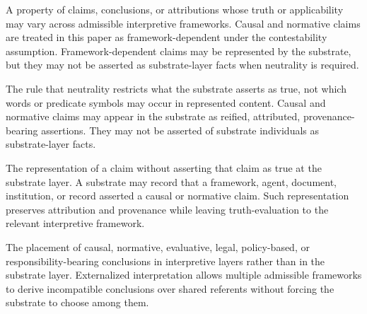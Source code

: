 \begin{description}[style=nextline,leftmargin=1.5cm]

\item[Framework-Dependent]
A property of claims, conclusions, or attributions
whose truth or applicability may vary across
admissible interpretive frameworks.
Causal and normative claims are treated in this paper
as framework-dependent under the contestability assumption.
Framework-dependent claims may be represented by the substrate,
but they may not be asserted as substrate-layer facts
when neutrality is required.

\item[Assertion-Level Exclusion]
The rule that neutrality restricts what the substrate asserts
as true, not which words or predicate symbols may occur
in represented content.
Causal and normative claims may appear in the substrate
as reified, attributed, provenance-bearing assertions.
They may not be asserted of substrate individuals
as substrate-layer facts.

\item[Representation Without Endorsement]
The representation of a claim without asserting that claim
as true at the substrate layer.
A substrate may record that a framework, agent,
document, institution, or record asserted a causal
or normative claim.
Such representation preserves attribution and provenance
while leaving truth-evaluation to the relevant interpretive framework.

\item[Externalized Interpretation]
The placement of causal, normative, evaluative,
legal, policy-based, or responsibility-bearing conclusions
in interpretive layers rather than in the substrate layer.
Externalized interpretation allows multiple admissible frameworks
to derive incompatible conclusions over shared referents
without forcing the substrate to choose among them.

\end{description}
